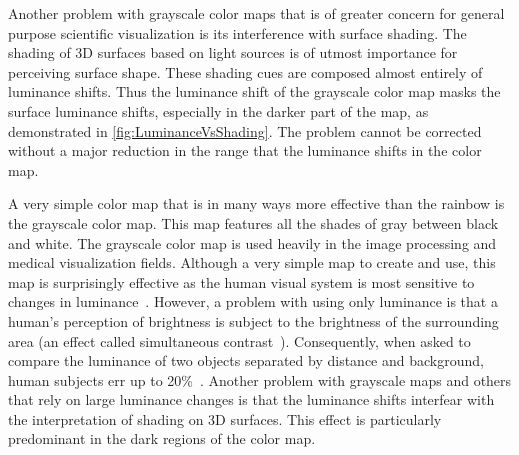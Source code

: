\documentclass{llncs}
\begin{document}
{  Another problem with grayscale color maps that is of greater concern for
  general purpose scientific visualization is its interference with surface
  shading.  The shading of 3D surfaces based on light sources is of utmost
  importance for perceiving surface shape.  These shading cues are composed
  almost entirely of luminance shifts.  Thus the luminance shift of the
  grayscale color map masks the surface luminance shifts, especially in the
  darker part of the map, as demonstrated in
  \autoref{fig:LuminanceVsShading}.  The problem cannot be corrected
  without a major reduction in the range that the luminance shifts in the
  color map.

}{

  A very simple color map that is in many ways more effective than the
  rainbow is the grayscale color map.  This map features all the shades of
  gray between black and white.  The grayscale color map is used heavily in
  the image processing and medical visualization fields.  Although a very
  simple map to create and use, this map is surprisingly effective as the
  human visual system is most sensitive to changes in
  luminance~\cite{Mullen85,Ware04}.  However, a problem with using only
  luminance is that a human's perception of brightness is subject to the
  brightness of the surrounding area (an effect called simultaneous
  contrast~\cite{Stone05}).  Consequently, when asked to compare the
  luminance of two objects separated by distance and background, human
  subjects err up to 20\%~\cite{Ware88}.  Another problem with grayscale
  maps and others that rely on large luminance changes is that the
  luminance shifts interfear with the interpretation of shading on 3D
  surfaces.  This effect is particularly predominant in the dark regions of
  the color map.

}
\end{document}
